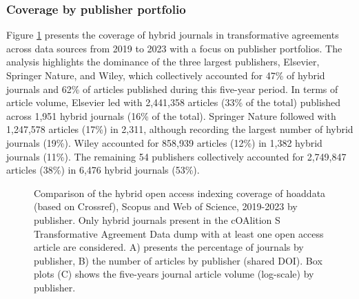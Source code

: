 \documentclass[a4paper,man,floatsintext,longtable,noextraspace,10pt]{apa6}
\begin{document}
\subsubsection{Coverage by publisher
portfolio}\label{coverage-by-publisher-portfolio}

Figure \ref{fig-upset_coverage_results_publisher} presents the coverage
of hybrid journals in transformative agreements across data sources from
2019 to 2023 with a focus on publisher portfolios. The analysis
highlights the dominance of the three largest publishers, Elsevier,
Springer Nature, and Wiley, which collectively accounted for 47\% of
hybrid journals and 62\% of articles published during this five-year
period. In terms of article volume, Elsevier led with 2,441,358 articles
(33\% of the total) published across 1,951 hybrid journals (16\% of the
total). Springer Nature followed with 1,247,578 articles (17\%) in
2,311, although recording the largest number of hybrid journals (19\%).
Wiley accounted for 858,939 articles (12\%) in 1,382 hybrid journals
(11\%). The remaining 54 publishers collectively accounted for 2,749,847
articles (38\%) in 6,476 hybrid journals (53\%).

\begin{figure}[ht!]


\caption{\label{fig-upset_coverage_results_publisher}Comparison of the
hybrid open access indexing coverage of hoaddata (based on Crossref),
Scopus and Web of Science, 2019-2023 by publisher. Only hybrid journals
present in the cOAlition S Transformative Agreement Data dump with at
least one open access article are considered. A) presents the percentage
of journals by publisher, B) the number of articles by publisher (shared
DOI). Box plots (C) shows the five-years journal article volume
(log-scale) by publisher.}

\end{figure}%
\end{document}
